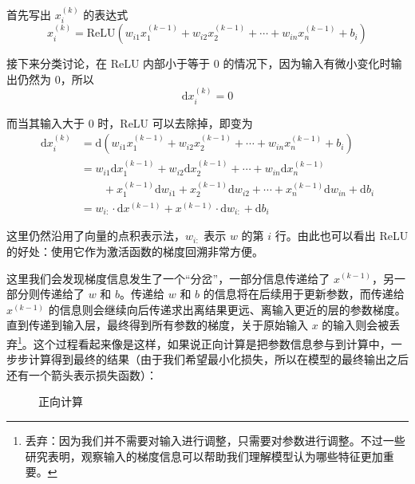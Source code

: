 首先写出 $x^{(k)}_i$ 的表达式
\[
    x^{(k)}_i = \text{ReLU}(w_{i1} x^{(k-1)}_1 + w_{i2} x^{(k-1)}_2 + \cdots + w_{in} x^{(k-1)}_n + b_i)
\]

接下来分类讨论，在 $\text{ReLU}$ 内部小于等于 0 的情况下，因为输入有微小变化时输出仍然为 0，所以
\[
    \mathrm{d}x^{(k)}_i = 0
\]

而当其输入大于 0 时，ReLU 可以去除掉，即变为
\[
    \begin{aligned}
        \mathrm{d}x^{(k)}_i & = \mathrm{d}(w_{i1} x^{(k-1)}_1 + w_{i2} x^{(k-1)}_2 + \cdots + w_{in} x^{(k-1)}_n + b_i)                                   \\
                            & = w_{i1} \mathrm{d}x^{(k-1)}_1 + w_{i2} \mathrm{d}x^{(k-1)}_2 + \cdots + w_{in} \mathrm{d}x^{(k-1)}_n                       \\
                            & \qquad +x^{(k-1)}_1 \mathrm{d}w_{i1} + x^{(k-1)}_2 \mathrm{d}w_{i2} + \cdots + x^{(k-1)}_n \mathrm{d}w_{in} + \mathrm{d}b_i \\
                            & = w_{i:} \cdot \mathrm{d}x^{(k-1)} + x^{(k-1)} \cdot \mathrm{d}w_{i:} + \mathrm{d}b_i
    \end{aligned}
\]

这里仍然沿用了向量的点积表示法，$w_{i:}$ 表示 $w$ 的第 $i$ 行。由此也可以看出 ReLU 的好处：使用它作为激活函数的梯度回溯非常方便。

这里我们会发现梯度信息发生了一个“分岔”，一部分信息传递给了 $x^{(k-1)}$，另一部分则传递给了 $w$ 和 $b$。传递给 $w$ 和 $b$ 的信息将在后续用于更新参数，而传递给 $x^{(k-1)}$ 的信息则会继续向后传递求出离结果更远、离输入更近的层的参数梯度。直到传递到输入层，最终得到所有参数的梯度，关于原始输入 $x$ 的输入则会被丢弃\footnote{丢弃：因为我们并不需要对输入进行调整，只需要对参数进行调整。不过一些研究表明，观察输入的梯度信息可以帮助我们理解模型认为哪些特征更加重要。}。这个过程看起来像是这样，如果说正向计算是把参数信息参与到计算中，一步步计算得到最终的结果（由于我们希望最小化损失，所以在模型的最终输出之后还有一个箭头表示损失函数）：
\begin{figure}[H]
    \centering
    \caption{正向计算}
\end{figure}

